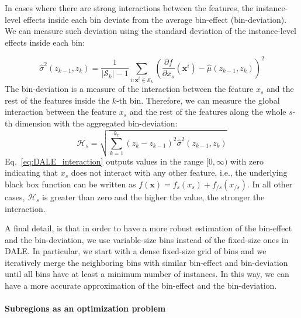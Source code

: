 \documentclass[12pt]{article}
\newcommand{\dfdx}{\frac{\partial f}{\partial x_s}}
\newcommand{\xb}{\mathbf{x}}
\begin{document}
In cases where there are strong interactions between the features,
the instance-level effects inside each bin deviate from the average bin-effect (bin-deviation).
We can measure such deviation using the standard deviation of the instance-level effects inside each bin:

\begin{equation}
  \label{eq:var_bin_approx}
  \hat{\sigma}^2(z_{k-1}, z_k) = \frac{1}{|\mathcal{S}_k| - 1}
\sum_{i:\mathbf{x}^i \in \mathcal{S}_k} \left ( \dfdx(\mathbf{x}^i) -
  \hat{\mu}(z_{k-1}, z_k) \right )^2
\end{equation}
%
The bin-deviation is a measure of the interaction between the feature \(x_s\) and the rest of the features inside the \(k\)-th bin.
Therefore, we can measure the global interaction between the feature \(x_s\) and the rest of the features along the whole \(s\)-th dimension
with the aggregated bin-deviation:
\begin{equation}
  \label{eq:DALE_interaction}
  \mathcal{H}_s = \sqrt{ \sum_{k=1}^{k_x} (z_k - z_{k-1})^2 \hat{\sigma}^2(z_{k-1}, z_k) }
\end{equation}
%
Eq.~\eqref{eq:DALE_interaction} outputs values in the range \([0, \infty)\) with zero indicating that \(x_s\) does not interact with any other feature,
i.e., the underlying black box function can be written as $f(\xb) = f_s(x_s) + f_{/s}(x_{/s})$.
In all other cases, $\mathcal{H}_s$ is greater than zero and the higher the value, the stronger the interaction.

A final detail, is that in order to have a more robust estimation of the bin-effect and the bin-deviation,
we use variable-size bins instead of the fixed-size ones in DALE.
In particular, we start with a dense fixed-size grid of bins and we iteratively merge the neighboring bins with similar
bin-effect and bin-deviation until all bins have at least a minimum number of instances.
In this way, we can have a more accurate approximation of the bin-effect and the bin-deviation.

\paragraph{Subregions as an optimization problem}
\end{document}
